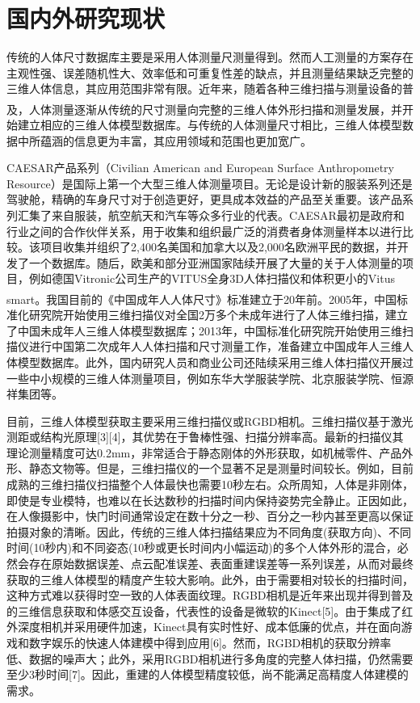 \documentclass[10pt]{article}
\newcommand{\upcite}[1]{\textsuperscript{\textsuperscript{\cite{#1}}}}
\begin{document}
\section{国内外研究现状}
传统的人体尺寸数据库主要是采用人体测量尺测量得到。然而人工测量的方案存在主观性强、误差随机性大、效率低和可重复性差的缺点，并且测量结果缺乏完整的三维人体信息，其应用范围非常有限。近年来，随着各种三维扫描与测量设备的普及，人体测量逐渐从传统的尺寸测量向完整的三维人体外形扫描和测量发展\upcite{measurement01}，并开始建立相应的三维人体模型数据库。与传统的人体测量尺寸相比，三维人体模型数据中所蕴涵的信息更为丰富，其应用领域和范围也更加宽广。
\par CAESAR产品系列（Civilian American and European Surface Anthropometry Resource）是国际上第一个大型三维人体测量项目。无论是设计新的服装系列还是驾驶舱，精确的车身尺寸对于创造更好，更具成本效益的产品至关重要。该产品系列汇集了来自服装，航空航天和汽车等众多行业的代表。CAESAR最初是政府和行业之间的合作伙伴关系，用于收集和组织最广泛的消费者身体测量样本以进行比较。该项目收集并组织了2,400名美国和加拿大以及2,000名欧洲平民的数据，并开发了一个数据库。随后，欧美和部分亚洲国家陆续开展了大量的关于人体测量的项目，例如德国Vitronic公司生产的VITUS全身3D人体扫描仪和体积更小的Vitus smart\upcite{measurement02}。我国目前的《中国成年人人体尺寸》标准建立于20年前。2005年，中国标准化研究院开始使用三维扫描仪对全国2万多个未成年进行了人体三维扫描，建立了中国未成年人三维人体模型数据库；2013年，中国标准化研究院开始使用三维扫描仪进行中国第二次成年人人体扫描和尺寸测量工作，准备建立中国成年人三维人体模型数据库。此外，国内研究人员和商业公司还陆续采用三维人体扫描仪开展过一些中小规模的三维人体测量项目，例如东华大学服装学院、北京服装学院、恒源祥集团等。
\par 目前，三维人体模型获取主要采用三维扫描仪或RGBD相机。三维扫描仪基于激光测距或结构光原理[3][4]，其优势在于鲁棒性强、扫描分辨率高。最新的扫描仪其理论测量精度可达0.2mm，非常适合于静态刚体的外形获取，如机械零件、产品外形、静态文物等。但是，三维扫描仪的一个显著不足是测量时间较长。例如，目前成熟的三维扫描仪扫描整个人体最快也需要10秒左右。众所周知，人体是非刚体，即使是专业模特，也难以在长达数秒的扫描时间内保持姿势完全静止。正因如此，在人像摄影中，快门时间通常设定在数十分之一秒、百分之一秒内甚至更高以保证拍摄对象的清晰。因此，传统的三维人体扫描结果应为不同角度(获取方向)、不同时间(10秒内)和不同姿态(10秒或更长时间内小幅运动)的多个人体外形的混合，必然会存在原始数据误差、点云配准误差、表面重建误差等一系列误差，从而对最终获取的三维人体模型的精度产生较大影响。此外，由于需要相对较长的扫描时间，这种方式难以获得时空一致的人体表面纹理。RGBD相机是近年来出现并得到普及的三维信息获取和体感交互设备，代表性的设备是微软的Kinect[5]。由于集成了红外深度相机并采用硬件加速，Kinect具有实时性好、成本低廉的优点，并在面向游戏和数字娱乐的快速人体建模中得到应用[6]。然而，RGBD相机的获取分辨率低、数据的噪声大；此外，采用RGBD相机进行多角度的完整人体扫描，仍然需要至少3秒时间[7]。因此，重建的人体模型精度较低，尚不能满足高精度人体建模的需求。
\end{document}
